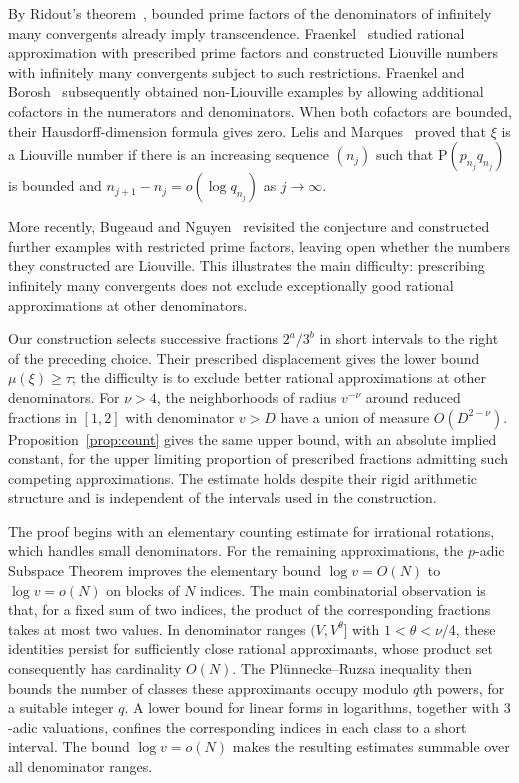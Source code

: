 \documentclass[11pt,reqno]{amsart}
\theoremstyle{definition}
\newcommand{\PP}{\mathrm P}
\begin{document}
By Ridout's theorem~\cite{Ridout}, bounded prime factors of the
denominators of infinitely many convergents already imply
transcendence. Fraenkel~\cite{Fraenkel62,Fraenkel} studied rational
approximation with prescribed prime factors and constructed Liouville
numbers with infinitely many convergents subject to such restrictions.
Fraenkel and Borosh~\cite{FraenkelBorosh} subsequently obtained
non-Liouville examples by allowing additional cofactors in the
numerators and denominators. When both cofactors are bounded, their
Hausdorff-dimension formula gives zero. 
Lelis and Marques~\cite[Theorem~1.1]{LelisMarques}
proved that $\xi$ is a Liouville number if there is an
increasing sequence $(n_j)$ such that
$\PP(p_{n_j}q_{n_j})$ is bounded and
$n_{j+1}-n_j=o(\log q_{n_j})$ as $j\to\infty$.


More recently, Bugeaud and Nguyen~\cite[Question~4.1, p.~32]{BN}
revisited the conjecture and constructed further examples with
restricted prime factors, leaving open whether the numbers they
constructed are Liouville. This illustrates the main difficulty:
prescribing infinitely many convergents does not exclude
exceptionally good rational approximations at other denominators.

Our construction selects successive fractions $2^a/3^b$
in short intervals to the right of the preceding choice.
Their prescribed displacement gives the lower bound
$\mu(\xi)\ge\tau$; the difficulty is to exclude better
rational approximations at other denominators. For
$\nu>4$, the neighborhoods of radius $v^{-\nu}$ around
reduced fractions in $[1,2]$ with denominator $v>D$
have a union of measure $O(D^{2-\nu})$. Proposition~\ref{prop:count} gives the same upper bound,
with an absolute implied constant, for the upper limiting
proportion of prescribed fractions admitting such competing
approximations. The estimate holds despite their rigid
arithmetic structure and is independent of the intervals
used in the construction.

The proof begins with an elementary counting estimate for
irrational rotations, which handles small denominators.
For the remaining approximations, the $p$-adic Subspace
Theorem improves the elementary bound $\log v=O(N)$ to
$\log v=o(N)$ on blocks of $N$ indices. The main
combinatorial observation is that, for a fixed sum of
two indices, the product of the corresponding fractions
takes at most two values. In denominator ranges
$(V,V^\theta]$ with $1<\theta<\nu/4$, these identities
persist for sufficiently close rational approximants,
whose product set consequently has cardinality $O(N)$.
The Pl\"unnecke--Ruzsa inequality then bounds the number
of classes these approximants occupy modulo $q$th powers,
for a suitable integer $q$. A lower bound for linear forms
in logarithms, together with $3$-adic valuations, confines
the corresponding indices in each class to a short
interval. The bound $\log v=o(N)$ makes the resulting
estimates summable over all denominator ranges.
\end{document}
